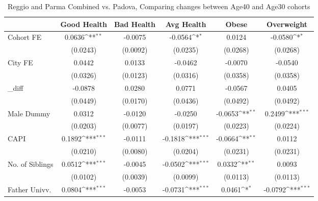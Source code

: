 \begin{table}[htbp]\centering
\def\sym#1{\ifmmode^{#1}\else\(^{#1}\)\fi}
\caption{Reggio and Parma Combined vs. Padova, Comparing changes between Age40 and Age30 cohorts}
\begin{tabular}{l*{5}{c}}
\toprule
            &\multicolumn{1}{c}{Good Health}&\multicolumn{1}{c}{Bad Health}&\multicolumn{1}{c}{Avg Health}&\multicolumn{1}{c}{Obese}&\multicolumn{1}{c}{Overweight}\\
\midrule
Cohort FE   &      0.0636\sym{**} &     -0.0075         &     -0.0564\sym{*}  &      0.0124         &     -0.0580\sym{*}  \\
            &    (0.0243)         &    (0.0092)         &    (0.0235)         &    (0.0268)         &    (0.0268)         \\
\addlinespace
City FE     &      0.0442         &      0.0133         &     -0.0462         &     -0.0070         &     -0.0540         \\
            &    (0.0326)         &    (0.0123)         &    (0.0316)         &    (0.0358)         &    (0.0358)         \\
\addlinespace
\_diff       &     -0.0878         &      0.0280         &      0.0771         &     -0.0567         &      0.0405         \\
            &    (0.0449)         &    (0.0170)         &    (0.0436)         &    (0.0492)         &    (0.0492)         \\
\addlinespace
Male Dummy  &      0.0312         &     -0.0120         &     -0.0250         &     -0.0653\sym{**} &      0.2499\sym{***}\\
            &    (0.0203)         &    (0.0077)         &    (0.0197)         &    (0.0223)         &    (0.0224)         \\
\addlinespace
CAPI        &      0.1892\sym{***}&     -0.0111         &     -0.1818\sym{***}&     -0.0664\sym{**} &      0.0112         \\
            &    (0.0210)         &    (0.0080)         &    (0.0204)         &    (0.0231)         &    (0.0231)         \\
\addlinespace
No. of Siblings&      0.0512\sym{***}&     -0.0045         &     -0.0502\sym{***}&      0.0332\sym{**} &      0.0093         \\
            &    (0.0102)         &    (0.0039)         &    (0.0099)         &    (0.0113)         &    (0.0113)         \\
\addlinespace
Father Univv.&      0.0804\sym{***}&     -0.0053         &     -0.0731\sym{***}&      0.0461\sym{*}  &     -0.0792\sym{***}\\

\end{tabular}
\end{table}

